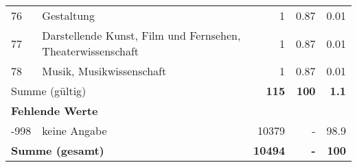 \begin{longtable}{lXrrr}
        76 & \multicolumn{1}{X}{Gestaltung} & %
          \num{1} &
          \num[round-mode=places,round-precision=2]{0,87} &
          \num[round-mode=places,round-precision=2]{0,01} \\

        77 & \multicolumn{1}{X}{Darstellende Kunst, Film und Fernsehen, Theaterwissenschaft} & %
          \num{1} &
          \num[round-mode=places,round-precision=2]{0,87} &
          \num[round-mode=places,round-precision=2]{0,01} \\

        78 & \multicolumn{1}{X}{Musik, Musikwissenschaft} & %
          \num{1} &
          \num[round-mode=places,round-precision=2]{0,87} &
          \num[round-mode=places,round-precision=2]{0,01} \\

     \midrule
     \multicolumn{2}{l}{Summe (gültig)} &
       \textbf{\num{115}} &
     \textbf{100} &
       \textbf{\num[round-mode=places,round-precision=2]{1,1}} \\
     \multicolumn{5}{l}{\textbf{Fehlende Werte}}\\
       -998 &
       keine Angabe &
         \num{10379} &
        - &
         \num[round-mode=places,round-precision=2]{98,9} \\
     \midrule
     \multicolumn{2}{l}{\textbf{Summe (gesamt)}} &
          \textbf{\num{10494}} &
        \textbf{-} &
        \textbf{100} \\
     \bottomrule
     \end{longtable}
     
